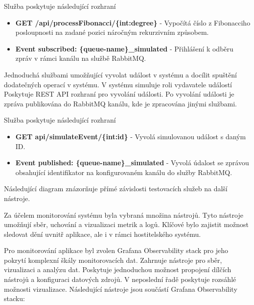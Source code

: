 Služba poskytuje následující rozhraní

\begin{itemize}
    \item \textbf{GET /api/processFibonacci/\{int:degree\}} - Vypočítá číslo z Fibonacciho posloupnosti na zadané pozici náročným rekurzivním způsobem.
    \item \textbf{Event subscribed: \{queue-name\}\_simulated} - Přihlášení k odběru zpráv v rámci kanálu na službě RabbitMQ.
\end{itemize}


Jednoduchá službami umožňující vyvolat událost v systému a docílit spuštění dodatečných operací v systému. V systému simuluje roli vydavatele událostí Poskytuje REST API rozhraní pro vyvolání události. Po vyvolání události je zpráva publikována do RabbitMQ kanálu, kde je zpracována jinými službami.

Služba poskytuje následující rozhraní

\begin{itemize}
    \item \textbf{GET api/simulateEvent/\{int:id\}} - Vyvolá simulovanou událost s daným ID.
    \item \textbf{Event published: \{queue-name\}\_simulated} - Vyvolá údalost se zprávou obsahující identifikator na konfigurovaném kanálu do služby RabbitMQ.
\end{itemize}

Následující diagram znázorňuje přímé závislosti testovacích služeb na další nástroje.



Za účelem monitorování systému byla vybraná množina nástrojů. Tyto nástroje umožňují sběr, uchování a vizualizaci metrik a logů. Klíčové bylo zajistit možnost sledovat dění uvnitř aplikace, ale i v rámci hostitelského systému. 


Pro monitorování aplikace byl zvolen Grafana Observability stack pro jeho pokrytí komplexní škály monitorovacích dat. Zahrnuje nástroje pro sběr, vizualizaci a analýzu dat. Poskytuje jednoduchou možnost propojení dílčích nástrojů a konfiguraci datových zdrojů. V neposlední řadě poskytuje rozsáhlé možnosti vizualizace. Následující nástroje jsou součástí Grafana Observability stacku:


